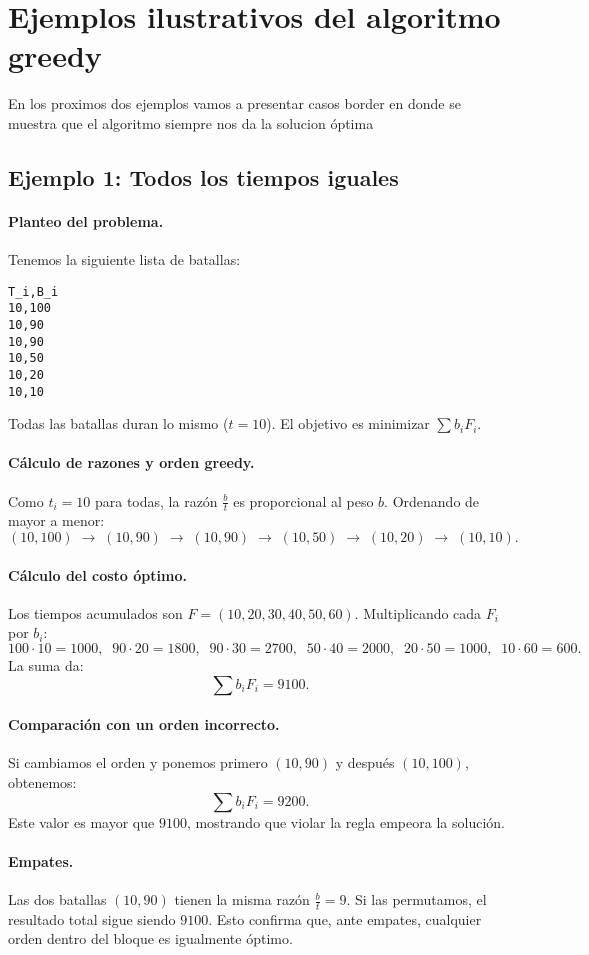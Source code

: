 \section{Ejemplos ilustrativos del algoritmo greedy}
En los proximos dos ejemplos vamos a presentar casos border en donde se muestra que el algoritmo siempre nos da la solucion óptima

\subsection{Ejemplo 1: Todos los tiempos iguales}

\paragraph{Planteo del problema.}  
Tenemos la siguiente lista de batallas:
\begin{verbatim}
T_i,B_i
10,100
10,90
10,90
10,50
10,20
10,10
\end{verbatim}
Todas las batallas duran lo mismo ($t=10$). El objetivo es minimizar $\sum b_i F_i$.

\paragraph{Cálculo de razones y orden greedy.}  
Como $t_i=10$ para todas, la razón $\tfrac{b}{t}$ es proporcional al peso $b$.  
Ordenando de mayor a menor: 
\[
(10,100)\;\to\;(10,90)\;\to\;(10,90)\;\to\;(10,50)\;\to\;(10,20)\;\to\;(10,10).
\]

\paragraph{Cálculo del costo óptimo.}  
Los tiempos acumulados son $F=(10,20,30,40,50,60)$.  
Multiplicando cada $F_i$ por $b_i$:
\[
100\cdot10=1000,\;\;90\cdot20=1800,\;\;90\cdot30=2700,\;\;50\cdot40=2000,\;\;20\cdot50=1000,\;\;10\cdot60=600.
\]
La suma da:
\[
\sum b_i F_i = \boxed{9100}.
\]

\paragraph{Comparación con un orden incorrecto.}  
Si cambiamos el orden y ponemos primero $(10,90)$ y después $(10,100)$, obtenemos:
\[
\sum b_i F_i = 9200.
\]
Este valor es mayor que $9100$, mostrando que violar la regla empeora la solución.

\paragraph{Empates.}  
Las dos batallas $(10,90)$ tienen la misma razón $\tfrac{b}{t}=9$.  
Si las permutamos, el resultado total sigue siendo $9100$.  
Esto confirma que, ante empates, cualquier orden dentro del bloque es igualmente óptimo.

